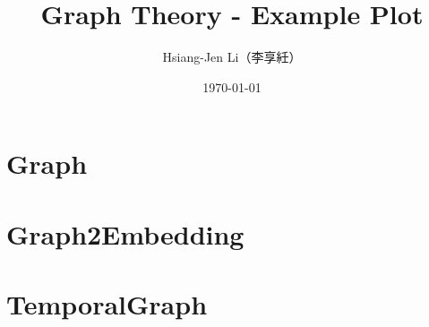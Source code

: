 \documentclass[12pt]{article}
\title{Graph Theory - Example Plot }
\author{Hsiang-Jen Li（李享紝）}
\date{\today}
\begin{document}
    \maketitle
    \newpage

    \section{Graph}
    
    
    \section{Graph2Embedding}
    

    \section{TemporalGraph}
\end{document}
